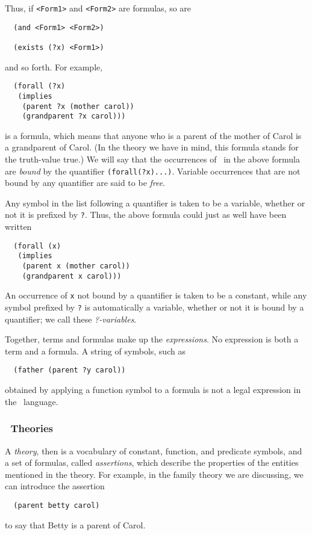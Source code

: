 Thus, if \verb'<Form1>' and \verb'<Form2>' are formulas, so are
\begin{verbatim}
  (and <Form1> <Form2>)

  (exists (?x) <Form1>)
\end{verbatim}
and so forth.  For example,
\begin{verbatim}
  (forall (?x)
   (implies
    (parent ?x (mother carol))
    (grandparent ?x carol)))
\end{verbatim}
is a formula, which means that anyone who is a parent of the mother of Carol
is a grandparent of Carol.  (In the theory we have in mind, this formula
stands for the truth-value true.)  We will say that the occurrences of \varx\
in the above formula are {\em bound} by the quantifier
\verb'(forall(?x)...)'.
Variable occurrences that are not bound by any quantifier are said to be {\em
free}.

Any symbol in the list following a quantifier is taken to be a variable,
whether or not it is prefixed by \verb'?'.  Thus, the above formula could
just as well have been written
\begin{verbatim}
  (forall (x)
   (implies
    (parent x (mother carol))
    (grandparent x carol)))
\end{verbatim}
An occurrence of \verb'x' not bound by a quantifier is
taken to be a constant, while any symbol prefixed by \verb'?' is
automatically a variable, whether or not it is bound by a quantifier;
we call these {\em ?-variables}.

Together, terms and formulas make up the {\em expressions}.  No expression is
both a term and a formula.  A string of symbols, such as
\begin{verbatim}
  (father (parent ?y carol))
\end{verbatim}
obtained by applying a function symbol to a formula is not a legal expression
in the \snark\  language.

\subsubsection{\Snark\  Theories}

A {\em theory}, then is a vocabulary of constant, function, and predicate
symbols, and a set of formulas, called {\em assertions}, which describe the
properties of the entities mentioned in the theory.  For example, in the
family theory we are discussing, we can introduce the assertion
\begin{verbatim}
  (parent betty carol)
\end{verbatim}
to say that Betty is a parent of Carol.

